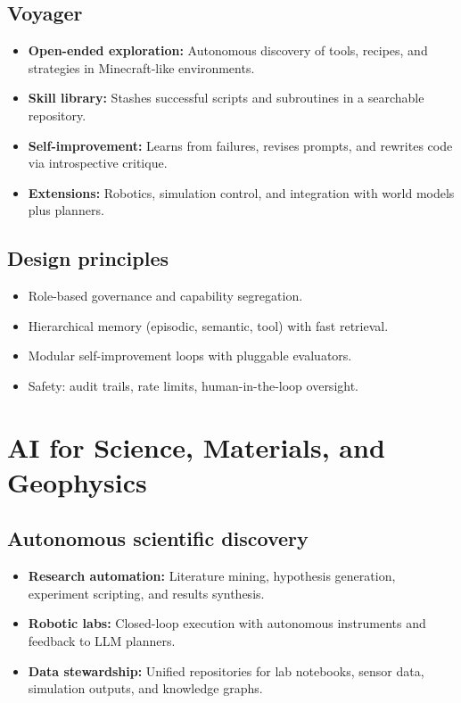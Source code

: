 \documentclass{article}
\begin{document}
\subsection{Voyager}
\begin{itemize}
  \item \textbf{Open-ended exploration:} Autonomous discovery of tools, recipes, and strategies in Minecraft-like environments.
  \item \textbf{Skill library:} Stashes successful scripts and subroutines in a searchable repository.
  \item \textbf{Self-improvement:} Learns from failures, revises prompts, and rewrites code via introspective critique.
  \item \textbf{Extensions:} Robotics, simulation control, and integration with world models plus planners.
\end{itemize}

\subsection{Design principles}
\begin{itemize}
  \item Role-based governance and capability segregation.
  \item Hierarchical memory (episodic, semantic, tool) with fast retrieval.
  \item Modular self-improvement loops with pluggable evaluators.
  \item Safety: audit trails, rate limits, human-in-the-loop oversight.
\end{itemize}

\section{AI for Science, Materials, and Geophysics}
\subsection{Autonomous scientific discovery}
\begin{itemize}
  \item \textbf{Research automation:} Literature mining, hypothesis generation, experiment scripting, and results synthesis.
  \item \textbf{Robotic labs:} Closed-loop execution with autonomous instruments and feedback to LLM planners.
  \item \textbf{Data stewardship:} Unified repositories for lab notebooks, sensor data, simulation outputs, and knowledge graphs.
\end{itemize}
\end{document}
